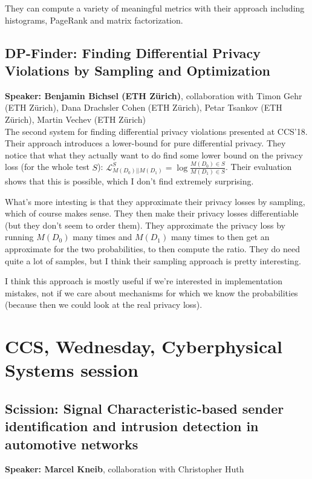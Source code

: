 \documentclass{article}
\begin{document}
They can compute a variety of meaningful metrics with their approach including histograms, PageRank and matrix factorization.

\subsection{DP-Finder: Finding Differential Privacy Violations by Sampling and Optimization}
\noindent\textbf{Speaker: Benjamin Bichsel (ETH Zürich)}, collaboration with Timon Gehr (ETH Zürich), Dana Drachsler Cohen (ETH Zürich), Petar Tsankov (ETH Zürich), Martin Vechev (ETH Zürich)\\

The second system for finding differential privacy violations presented at CCS'18. Their approach introduces a lower-bound for pure differential privacy. They notice that what they actually want to do find some lower bound on the privacy loss (for the whole test $S$): $\mathcal L^S_{M(D_0)||M(D_1)} = \log\frac{M(D_0) \in S}{M(D_1) \in S}$. Their evaluation shows that this is possible, which I don't find extremely surprising.

What's more intesting is that they approximate their privacy losses by sampling, which of course makes sense. They then make their privacy losses differentiable (but they don't seem to order them). They approximate the privacy loss by running $M(D_0)$ many times and $M(D_1)$ many times to then get an approximate for the two probabilities, to then compute the ratio. They do need quite a lot of samples, but I think their sampling approach is pretty interesting.

I think this approach is mostly useful if we're interested in implementation mistakes, not if we care about mechanisms for which we know the probabilities (because then we could look at the real privacy loss).

\section{CCS, Wednesday, Cyberphysical Systems session}

\subsection{Scission: Signal Characteristic-based sender identification and intrusion detection in automotive networks}
\noindent\textbf{Speaker: Marcel Kneib}, collaboration with Christopher Huth\\
\end{document}
